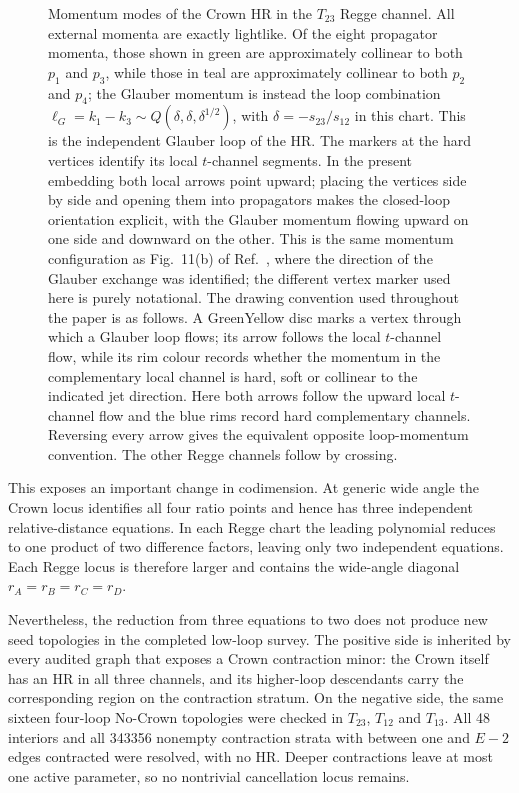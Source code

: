 \documentclass[a4paper,11pt]{article}
\newcommand{\GlauberVertex}[3][blue]{%
 \begin{scope}[shift={#2},rotate=#3]
  \draw[fill=GreenYellow,draw=#1,line width=.55mm] (0,0) circle (6pt);
  \draw[->,>=stealth,draw=#1,line width=.75pt]
    (-4.2pt,0)--(4.2pt,0);
 \end{scope}%
}
\begin{document}
\begin{figure}[htbp]
\caption{Momentum modes of the Crown HR in the \(T_{23}\) Regge channel.
All external momenta are exactly lightlike.  Of the eight propagator momenta,
those shown in green are approximately collinear to both \(p_1\) and \(p_3\),
while those in teal are approximately collinear to both \(p_2\) and \(p_4\);
the Glauber momentum is instead the loop combination
\(\ell_G=k_1-k_3\sim Q(\delta,\delta,\delta^{1/2})\), with
\(\delta=-s_{23}/s_{12}\) in this chart.  This is the independent Glauber
loop of the HR.  The markers at the hard vertices identify its local
\(t\)-channel segments.  In the present embedding both local arrows point
upward; placing the vertices side by side and opening them into propagators
makes the closed-loop orientation explicit, with the Glauber momentum flowing
upward on one side and downward on the other.  This is the same momentum
configuration as Fig.~11(b) of Ref.~\cite{Gardi:2024axt}, where the direction
of the Glauber exchange was identified; the different vertex marker used here
is purely notational.  The drawing convention used throughout the paper is as
follows.  A GreenYellow disc marks a vertex through which a Glauber loop
flows; its arrow follows the local \(t\)-channel flow, while its rim
colour records whether the momentum in the complementary local channel is
hard, soft or collinear to the indicated jet direction.  Here both arrows
follow the upward local \(t\)-channel flow and the blue rims record hard
complementary channels.  Reversing every arrow gives the equivalent opposite
loop-momentum convention.  The other Regge channels follow by crossing.}
\label{fig:crown-regge-glauber}
\end{figure}
This exposes an important change in codimension.  At generic wide angle the
Crown locus identifies all four ratio points and hence has three independent
relative-distance equations.  In each Regge chart the leading polynomial
reduces to one product of two difference factors, leaving only two independent
equations.  Each Regge locus is therefore larger and contains the wide-angle diagonal
\(r_A=r_B=r_C=r_D\).

Nevertheless, the reduction from three equations to two does not produce
new seed topologies in the completed low-loop survey.  The positive side is
inherited by every audited graph that exposes a Crown
contraction minor: the Crown itself has an HR in all three channels, and its
higher-loop descendants carry the corresponding region on the contraction
stratum.  On the negative
side, the same sixteen four-loop No-Crown topologies were checked in
\(T_{23}\), \(T_{12}\) and \(T_{13}\).  All 48 interiors and all 343356
nonempty contraction strata with between one and \(E-2\) edges contracted were
resolved, with no HR.  Deeper contractions leave at most one active parameter,
so no nontrivial cancellation locus remains.
\end{document}
